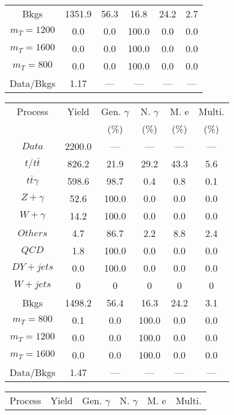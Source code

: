 \begin{figure}
\begin{minipage}[c]{0.32\textwidth}
{\begin{tabular}{cccccc}
Bkgs &  1351.9 &  56.3 &  16.8 &  24.2 &  2.7\\
$ m_{T} = 1200 $ &  0.0 &  0.0 &  100.0 &  0.0 &  0.0\\
$ m_{T} = 1600 $ &  0.0 &  0.0 &  100.0 &  0.0 &  0.0\\
$ m_{T} = 800 $ &  0.0 &  0.0 &  100.0 &  0.0 &  0.0\\
Data/Bkgs &  1.17 &  --- &  --- &  --- &  ---\\
\hline
\end{tabular}
}
\end{minipage}
\begin{minipage}[c]{0.32\textwidth}
\centering
\tiny{
\begin{tabular}{cccccc}
\hline
Process & Yield & Gen. $\gamma$ & N. $\gamma$ & M. e & Multi. \\
 &  & (\%) & (\%) & (\%) & (\%)  \\
\hline
                                                                      $ Data $ &  2200.0 &  --- &  --- &  --- &  ---\\
$ t/t\bar{t} $ &  826.2 &  21.9 &  29.2 &  43.3 &  5.6\\
$ t\bar{t}\gamma $ &  598.6 &  98.7 &  0.4 &  0.8 &  0.1\\
$ Z+\gamma $ &  52.6 &  100.0 &  0.0 &  0.0 &  0.0\\
$ W+\gamma $ &  14.2 &  100.0 &  0.0 &  0.0 &  0.0\\
$ Others $ &  4.7 &  86.7 &  2.2 &  8.8 &  2.4\\
$ QCD $ &  1.8 &  100.0 &  0.0 &  0.0 &  0.0\\
$ DY+jets $ &  0.0 &  100.0 &  0.0 &  0.0 &  0.0\\
$ W+jets $ &  0 &  0 &  0 &  0 &  0\\
Bkgs &  1498.2 &  56.4 &  16.3 &  24.2 &  3.1\\
$ m_{T} = 800 $ &  0.1 &  0.0 &  100.0 &  0.0 &  0.0\\
$ m_{T} = 1200 $ &  0.0 &  0.0 &  100.0 &  0.0 &  0.0\\
$ m_{T} = 1600 $ &  0.0 &  0.0 &  100.0 &  0.0 &  0.0\\
Data/Bkgs &  1.47 &  --- &  --- &  --- &  ---\\
\hline
\end{tabular}
}
\end{minipage}
\begin{minipage}[c]{0.32\textwidth}
\centering
\tiny{
\begin{tabular}{cccccc}
\hline
Process & Yield & Gen. $\gamma$ & N. $\gamma$ & M. e & Multi. \\

\end{tabular}}
\end{minipage}
\end{figure}
